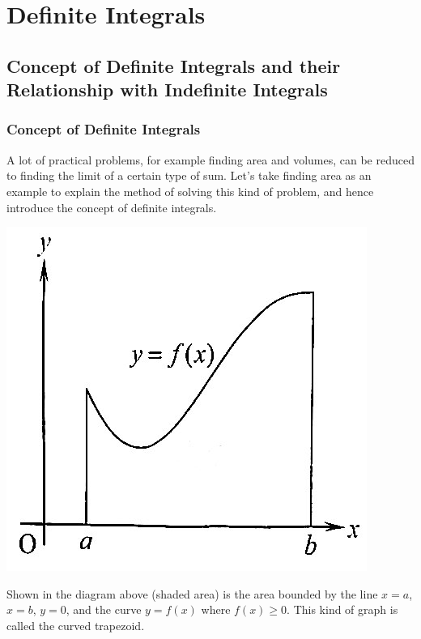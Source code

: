 \chapter{Definite Integrals}

\section{Concept of Definite Integrals and their Relationship with Indefinite Integrals}

\subsection*{Concept of Definite Integrals}

A lot of practical problems, for example finding area and volumes, can be
reduced to finding the limit of a certain type of sum. Let's take finding area
as an example to explain the method of solving this kind of problem, and hence
introduce the concept of definite integrals.

\begin{center}
    \includegraphics[scale=0.3]{assets/28-3.jpg}
\end{center}

Shown in the diagram above (shaded area) is the area bounded by the line $x =
    a$, $x = b$, $y = 0$, and the curve $y = f(x)$ where $f(x) \geq 0$. This kind
of graph is called the curved trapezoid.

